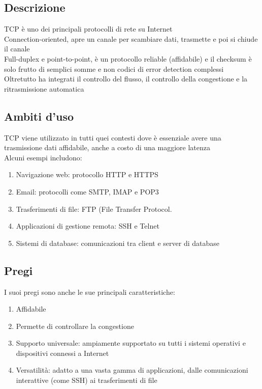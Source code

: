 \documentclass[10pt,oneside,a4paper]{article}
\begin{document}
\subsection{Descrizione}
TCP è uno dei principali protocolli di rete su Internet\\
Connection-oriented, apre un canale per scambiare dati, trasmette e poi si chiude il canale\\
Full-duplex e point-to-point, è un protocollo reliable (affidabile) e il checksum è solo frutto di semplici somme e non codici di error detection complessi\\
Oltretutto ha integrati il controllo del flusso, il controllo della congestione e la ritrasmissione automatica
\subsection{Ambiti d'uso}
TCP viene utilizzato in tutti quei contesti dove è essenziale avere una trasmissione dati affidabile, anche a costo di una maggiore latenza\\
Alcuni esempi includono:
\begin{enumerate}
\item Navigazione web: protocollo HTTP e HTTPS
\item Email: protocolli come SMTP, IMAP e POP3
\item Trasferimenti di file: FTP (File Transfer Protocol.
\item Applicazioni di gestione remota: SSH e Telnet
\item Sistemi di database: comunicazioni tra client e server di database
\end{enumerate}
\subsection{Pregi}
I suoi pregi sono anche le sue principali caratteristiche:
\begin{enumerate}
\item Affidabile
\item Permette di controllare la congestione
\item Supporto universale: ampiamente supportato su tutti i sistemi operativi e dispositivi connessi a Internet
\item Versatilità: adatto a una vasta gamma di applicazioni, dalle comunicazioni interattive (come SSH) ai trasferimenti di file
\end{enumerate}
\end{document}
